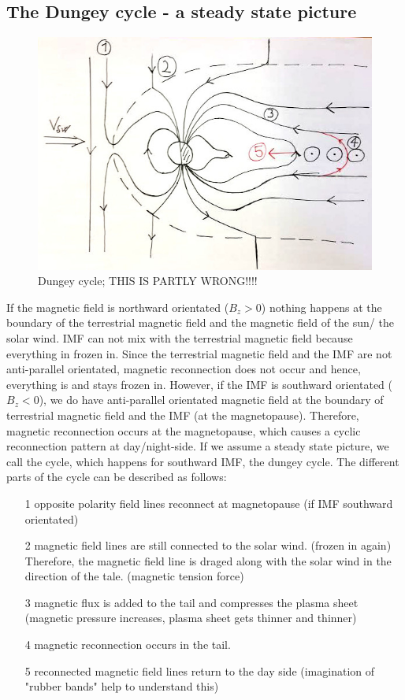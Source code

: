 \documentclass[10pt,a4paper]{article}
\begin{document}
\subsection{The Dungey cycle - a steady state picture \label{_CHAP_THEO_Dungey cycle}}

\begin{figure}[h]
\centering
\caption{Dungey cycle; THIS IS PARTLY WRONG!!!!}
\label{aurora substorm}
\includegraphics[scale=0.5]{solvind.jpg}
\end{figure}

If the magnetic field is northward orientated ($B_z>0$) nothing happens at the boundary of the terrestrial magnetic field and the magnetic field of the sun/ the solar wind. IMF can not mix with the terrestrial magnetic field because everything in frozen in. Since the terrestrial magnetic field and the IMF are not anti-parallel orientated, magnetic reconnection does not occur and hence, everything is and stays frozen in. 
However, if the IMF is southward orientated ($B_z<0$), we do have anti-parallel orientated magnetic field at the boundary of terrestrial magnetic field and the IMF (at the magnetopause). Therefore, magnetic reconnection occurs at the magnetopause, which causes a cyclic reconnection pattern at day/night-side. If we assume a steady state picture, we call the cycle, which happens for southward IMF, the dungey cycle. The different parts of the cycle can be described as follows:
\begin{itemize}
\item[1] opposite polarity field lines reconnect at magnetopause (if IMF southward orientated)
\item[2] magnetic field lines are still connected to the solar wind. (frozen in again) Therefore, the magnetic field line is draged along with the solar wind in the direction of the tale. (magnetic tension force)
\item[3] magnetic flux is added to the tail and compresses the plasma sheet (magnetic pressure increases, plasma sheet gets thinner and thinner)
\item[4] magnetic reconnection occurs in the tail. 
\item[5] reconnected magnetic field lines return to the day side (imagination of "rubber bands" help to understand this)
\end{itemize}
\end{document}
